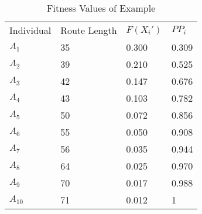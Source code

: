 \begin{table}[H]
	\begin{center}
		\begin{tabular}{llll}
			Individual & Route Length & $F(X_i')$              &  $PP_i$               \\
			$A_{1}$         & 35           & 0.300  & 0.309 \\
			$A_{2}$         & 39           & 0.210  & 0.525 \\
			$A_{3}$          & 42           & 0.147  & 0.676 \\
			$A_{4}$          & 43           & 0.103 & 0.782 \\
			$A_{5}$         & 50           & 0.072 & 0.856 \\
			$A_{6}$          & 55           & 0.050 & 0.908 \\
			$A_{7}$          & 56           & 0.035 & 0.944 \\
			$A_{8}$          & 64           & 0.025 & 0.970 \\
			$A_{9}$          & 70           & 0.017 & 0.988 \\
			$A_{10}$         & 71           & 0.012 & 1                
		\end{tabular}
		\caption{Fitness Values of Example}
		\label{table:ExampleFitVal}
	\end{center}
\end{table}

